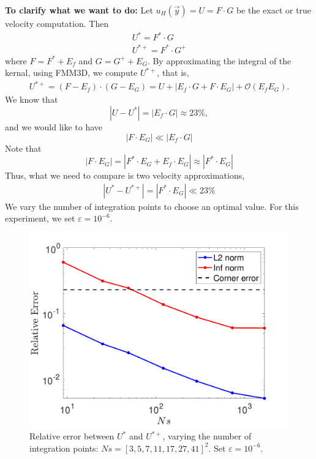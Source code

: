 {\bf To clarify what we want to do:}
Let $u_H(\vec{y})  = U = F \cdot  G$ be the exact or true velocity computation. Then 
\begin{align}
	U^* = F^* \cdot  G
	\\
	U^{*+} = F^* \cdot  G^+
\end{align}
where $F = F^* + E_f$ and $G =  G^+ + E_G$.
By approximating the integral of the kernal, using FMM3D, we compute $U^{*+}$, that is,
\begin{align}
	U^{*+} = (F-E_f) \cdot (G - E_G) 
	= U +  \left| E_f \cdot G + F  \cdot E_G \right|  + \mathcal{O}(E_f E_G).
\end{align}
We know that 
\[
	|U-U^*| = |E_f \cdot G| \approx 23 \%,
	\]
and we would like to have
\[
	|F  \cdot E_G| \ll	|E_f \cdot G |
\]
Note that 
\[
	  |F \cdot E_G| = |F^* \cdot E_G + E_f \cdot E_G|
	  \approx |F^* \cdot E_G |
\]
Thus, what we need to compare is two velocity approximations,
\begin{align}
	|U^* - U^{*+}| =| F^* \cdot E_G| \ll 23 \%
	\label{eq_condition_EG}
\end{align}
We vary the number of integration points to choose an optimal value. For this experiment, we set $\varepsilon = 10^{-6}$.
\begin{figure}[ht]
	\begin{center}
		\includegraphics[scale=0.33]{./figures/fig_Ef_EG_compare}
	\caption{Relative error between $U^*$ and $U^{*+}$, varying the number of integration points: $Ns = [3, 5, 7, 11, 17, 27,41]^2$. Set $\varepsilon = 10^{-6}$.}
	\label{fig_Ef_EG_compare}
\end{center}
\end{figure}
